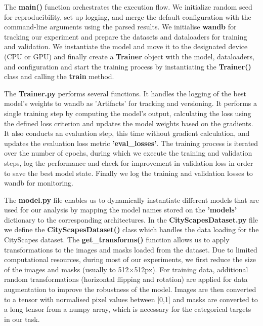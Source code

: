 \documentclass[a4paper,11pt]{article}
\begin{document}
The \textbf{main()} function orchestrates the execution flow. We initialize random seed for reproducibility, set up logging, and merge the default configuration with the command-line arguments using the parsed results. We initialise \textbf{wandb} for tracking our experiment and prepare the datasets and dataloaders for training and validation. We instantiate the model and move it to the designated device (CPU or GPU) and finally create a \textbf{Trainer} object with the model, dataloaders, and configuration and start the training process by instantiating the \textbf{Trainer()} class and calling the \textbf{train} method. 

The \textbf{Trainer.py} performs several functions. It handles the logging of the best model's weights to wandb as 'Artifacts' for tracking and versioning. It performs a single training step by computing the model's output, calculating the loss using the defined loss criterion and updates the model weights based on the gradients. It also conducts an evaluation step, this time without gradient calculation, and updates the evaluation loss metric \textbf{'eval\_losses'}. The training process is iterated over the number of epochs, during which we execute the training and validation steps, log the performance and check for improvement in validation loss in order to save the best model state. Finally we log the training and validation losses to wandb for monitoring. 

The \textbf{model.py} file enables us to dynamically instantiate different models that are used for our analysis by mapping the model names stored on the \textbf{'models'} dictionary to the corresponding architectures. In the \textbf{CityScapesDataset.py} file we define the \textbf{CityScapesDataset()} class which handles the data loading for the CityScapes dataset. The \textbf{get\_transforms()} function allows us to apply transformations to the images and masks loaded from the dataset. Due to limited computational resources, during most of our experiments, we first reduce the size of the images and masks (usually to 512$\times$512px). For training data, additional random transformations (horizontal flipping and rotation) are applied for data augmentation to improve the robustness of the model. Images are then converted to a tensor with normalised pixel values between [0,1] and masks are converted to a long tensor from a numpy array, which is necessary for the categorical targets in our task. 
\end{document}
